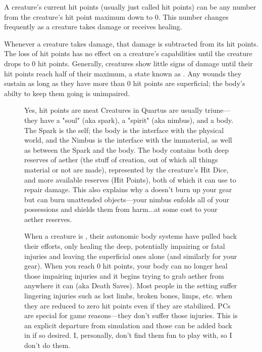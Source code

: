 A creature's current hit points (usually just called hit points) can be any number from the creature's hit point maximum down to 0. This number changes frequently as a creature takes damage or receives healing.

Whenever a creature takes damage, that damage is subtracted from its hit points. The loss of hit points has no effect on a creature's capabilities until the creature drops to 0 hit points. Generally, creatures show little signs of damage until their hit points reach half of their maximum, a state known as . Any wounds they sustain as long as they have more than 0 hit points are superficial; the body's abilty to keep them going is unimpaired.

\begin{figure}
    \begin{DndComment}{Yes, hit points are meat}
        Creatures in Quartus are usually triune---they have a "soul" (aka spark), a "spirit" (aka nimbus), and a body. The Spark is the self; the body is the interface with the physical world, and the Nimbus is the interface with the immaterial, as well as between the Spark and the body. The body contains both deep reserves of aether (the stuff of creation, out of which all things material or not are made), represented by the creature's Hit Dice, and more available reserves (Hit Points), both of which it can use to repair damage. This also explains why a  doesn't burn up your gear but can burn unattended objects---your nimbus enfolds all of your possessions and shields them from harm...at some cost to your aether reserves.

        When a creature is , their autonomic body systems have pulled back their efforts, only healing the deep, potentially impairing or fatal injuries and leaving the superficial ones alone (and similarly for your gear). When you reach 0 hit points, your body can no longer heal those impairing injuries and it begins trying to grab aether from anywhere it can (aka Death Saves). Most people in the setting suffer lingering injuries such as lost limbs, broken bones, limps, etc. when they are reduced to zero hit points even if they are stabilized. PCs are special for game reasons---they don't suffer those injuries. This is an explicit departure from simulation and those can be added back in if so desired. I, personally, don't find them fun to play with, so I don't do them.
    \end{DndComment}
\end{figure}

